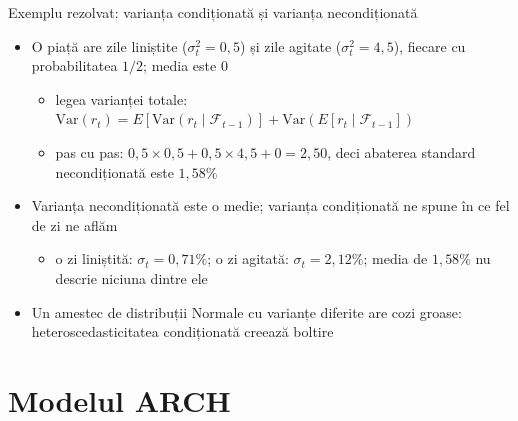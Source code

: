 \begin{frame}{Exemplu rezolvat: varianța condiționată și varianța necondiționată}
\itemsize{\small}
\begin{itemize}
    \item O piață are zile liniștite ($\sigma_t^2 = 0{,}5$) și zile agitate ($\sigma_t^2 = 4{,}5$), fiecare cu probabilitatea $1/2$; media este 0
    \begin{itemize}
        \item legea varianței totale: $\mathrm{Var}(r_t) = E[\mathrm{Var}(r_t \mid \mathcal{F}_{t-1})] + \mathrm{Var}(E[r_t \mid \mathcal{F}_{t-1}])$
        \item pas cu pas: $0{,}5 \times 0{,}5 + 0{,}5 \times 4{,}5 + 0 = 2{,}50$, deci abaterea standard necondiționată este $1{,}58\%$
    \end{itemize}
    \item Varianța necondiționată este o medie; varianța condiționată ne spune în ce fel de zi ne aflăm
    \begin{itemize}
        \item o zi liniștită: $\sigma_t = 0{,}71\%$; o zi agitată: $\sigma_t = 2{,}12\%$; media de $1{,}58\%$ nu descrie niciuna dintre ele
    \end{itemize}
    \item Un amestec de distribuții Normale cu varianțe diferite are cozi groase: heteroscedasticitatea condiționată creează boltire
\end{itemize}
\end{frame}


\section{Modelul ARCH}

